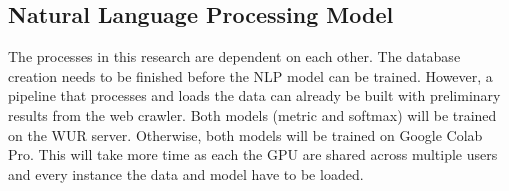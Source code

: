 \documentclass[a4paper, 12pt, oneside]{book} %
\begin{document}
\subsection{Natural Language Processing Model}
The processes in this research are dependent on each other.
The database creation needs to be finished before the NLP model can be trained.
However, a pipeline that processes and loads the data can already be built with preliminary results from the web crawler.
Both models (metric and softmax) will be trained on the WUR server.
Otherwise, both models will be trained on Google Colab Pro.
This will take more time as each the GPU are shared across multiple users and every instance the data  and model have to be loaded.


\printbibliography
\end{document}
